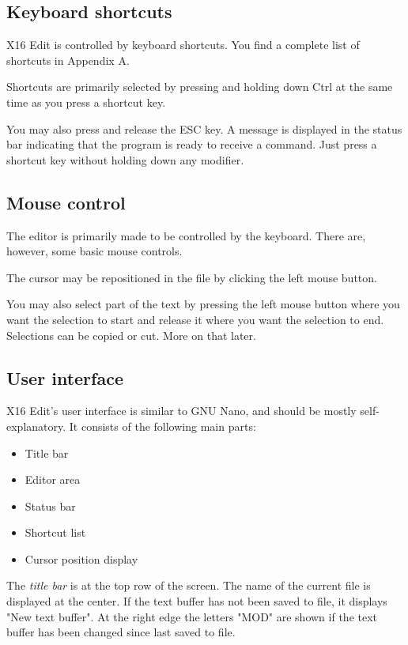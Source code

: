 \documentclass{article}
\begin{document}
    \subsection{Keyboard shortcuts}
        X16 Edit is controlled by keyboard shortcuts. You find a complete list
        of shortcuts in Appendix A.

        Shortcuts are primarily selected by pressing and holding down Ctrl at the
        same time as you press a shortcut key.

        You may also press and release the ESC key. A message is displayed
        in the status bar indicating that the program is ready to receive a command.
        Just press a shortcut key without holding down any modifier.

    \subsection{Mouse control}
        The editor is primarily made to be controlled by the keyboard. There are, however,
        some basic mouse controls.

        The cursor may be repositioned in the file by clicking the left mouse button.

        You may also select part of the text by pressing the left mouse button where
        you want the selection to start and release it where you want the selection to end. 
        Selections can be copied or cut. More on that later.
    
    \subsection{User interface}
        X16 Edit's user interface is similar to GNU Nano, and should be mostly self-explanatory.
        It consists of the following main parts:

        \begin{itemize}
            \item Title bar
            \item Editor area
            \item Status bar
            \item Shortcut list
            \item Cursor position display
        \end{itemize}

        The \textit{title bar} is at the top row of the screen. The name of the current file
        is displayed at the center. If the text buffer has not been saved to file, it displays
        "New text buffer". At the right edge the letters "MOD" are shown if the
        text buffer has been changed since last saved to file.
\end{document}
